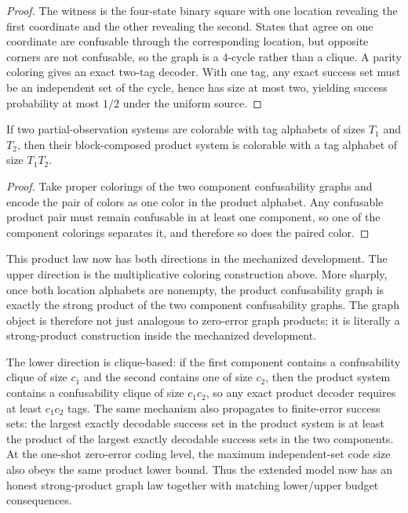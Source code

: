 \begin{proof}
The witness is the four-state binary square with one location revealing the first coordinate and the other revealing the second. States that agree on one coordinate are confusable through the corresponding location, but opposite corners are not confusable, so the graph is a $4$-cycle rather than a clique. A parity coloring gives an exact two-tag decoder. With one tag, any exact success set must be an independent set of the cycle, hence has size at most two, yielding success probability at most $1/2$ under the uniform source.
\end{proof}

\begin{theorem}\label{thm:multifact-product}
If two partial-observation systems are colorable with tag alphabets of sizes $T_1$ and $T_2$, then their block-composed product system is colorable with a tag alphabet of size $T_1T_2$.
\end{theorem}

\begin{proof}
Take proper colorings of the two component confusability graphs and encode the pair of colors as one color in the product alphabet. Any confusable product pair must remain confusable in at least one component, so one of the component colorings separates it, and therefore so does the paired color.
\end{proof}

This product law now has both directions in the mechanized development. The upper direction is the multiplicative coloring construction above. More sharply, once both location alphabets are nonempty, the product confusability graph is exactly the strong product of the two component confusability graphs. The graph object is therefore not just analogous to zero-error graph products; it is literally a strong-product construction inside the mechanized development. 

The lower direction is clique-based: if the first component contains a confusability clique of size $c_1$ and the second contains one of size $c_2$, then the product system contains a confusability clique of size $c_1c_2$, so any exact product decoder requires at least $c_1c_2$ tags. The same mechanism also propagates to finite-error success sets: the largest exactly decodable success set in the product system is at least the product of the largest exactly decodable success sets in the two components. At the one-shot zero-error coding level, the maximum independent-set code size also obeys the same product lower bound. Thus the extended model now has an honest strong-product graph law together with matching lower/upper budget consequences.

